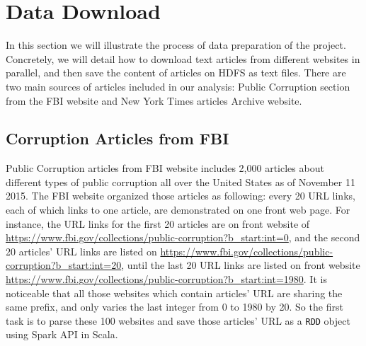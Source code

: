 \section{Data Download}

In this section we will illustrate the process of data preparation of the project.
Concretely, we will detail how to download text articles from different websites
in parallel, and then save the content of articles on HDFS as text files. 
There are two main sources of articles included in our analysis: Public Corruption
section from the FBI website and New York Times articles Archive website. 

\subsection{Corruption Articles from FBI}

Public Corruption articles from FBI website includes 2,000 articles about different
types of public corruption all over the United States as of November 11 2015. 
The FBI website organized those articles as following: every 20 URL links, each
of which links to one article, are demonstrated on one front web page. For instance, 
the URL links for the first 20 articles are on front website of 
\url{https://www.fbi.gov/collections/public-corruption?b_start:int=0}, and the
second 20 articles' URL links are listed on 
\url{https://www.fbi.gov/collections/public-corruption?b_start:int=20}, until
the last 20 URL links are listed on front website
\url{https://www.fbi.gov/collections/public-corruption?b_start:int=1980}. It is
noticeable that all those websites which contain articles' URL are sharing the 
same prefix, and only varies the last integer from 0 to 1980 by 20. So the first
task is to parse these 100 websites and save those articles' URL as a \texttt{RDD}
object using Spark API in Scala.

